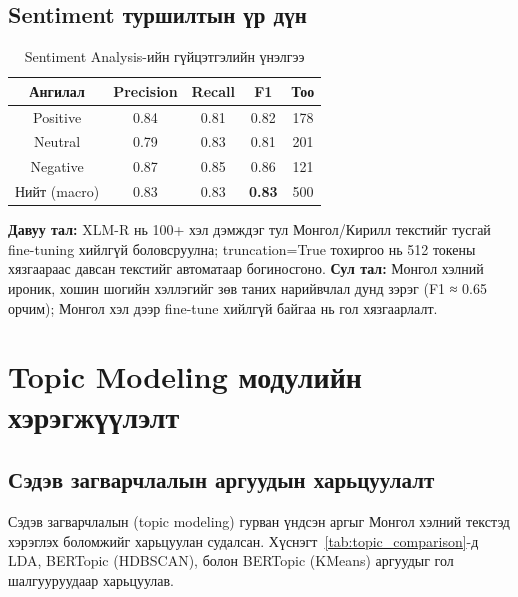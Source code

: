 \subsection{Sentiment туршилтын үр дүн}

\begin{table}[h!]
\centering
\renewcommand{\arraystretch}{1.4}
\begin{tabular}{|c|c|c|c|c|}
\hline
\textbf{Ангилал} & \textbf{Precision} & \textbf{Recall} & \textbf{F1} & \textbf{Тоо} \\ \hline
Positive & 0.84 & 0.81 & 0.82 & 178 \\ \hline
Neutral & 0.79 & 0.83 & 0.81 & 201 \\ \hline
Negative & 0.87 & 0.85 & 0.86 & 121 \\ \hline
Нийт (macro) & 0.83 & 0.83 & \textbf{0.83} & 500 \\ \hline
\end{tabular}
\caption{Sentiment Analysis-ийн гүйцэтгэлийн үнэлгээ}
\label{tab:sentiment_results}
\end{table}

\textbf{Давуу тал:} XLM-R нь 100+ хэл дэмждэг тул Монгол/Кирилл текстийг тусгай fine-tuning хийлгүй боловсруулна; truncation=True тохиргоо нь 512 токены хязгаараас давсан текстийг автоматаар богиносгоно. \textbf{Сул тал:} Монгол хэлний ироник, хошин шогийн хэллэгийг зөв таних нарийвчлал дунд зэрэг (F1 ≈ 0.65 орчим); Монгол хэл дээр fine-tune хийлгүй байгаа нь гол хязгаарлалт.

\section{Topic Modeling модулийн хэрэгжүүлэлт}

\subsection{Сэдэв загварчлалын аргуудын харьцуулалт}

Сэдэв загварчлалын (topic modeling) гурван үндсэн аргыг Монгол хэлний текстэд хэрэглэх боломжийг харьцуулан судалсан. Хүснэгт~\ref{tab:topic_comparison}-д LDA, BERTopic (HDBSCAN), болон BERTopic (KMeans) аргуудыг гол шалгууруудаар харьцуулав.

